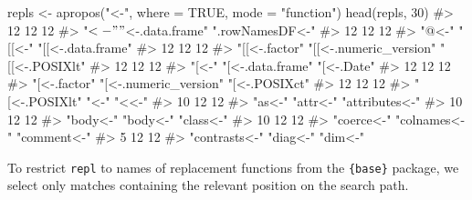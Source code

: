 \documentclass[
]{krantz}
\makeatletter
\newenvironment{Shaded}{\begin{snugshade}}{\end{snugshade}}
\newcommand{\CommentTok}[1]{\textcolor[rgb]{0.56,0.35,0.01}{\textit{#1}}}
\newcommand{\DataTypeTok}[1]{\textcolor[rgb]{0.13,0.29,0.53}{#1}}
\newcommand{\DecValTok}[1]{\textcolor[rgb]{0.00,0.00,0.81}{#1}}
\newcommand{\KeywordTok}[1]{\textcolor[rgb]{0.13,0.29,0.53}{\textbf{#1}}}
\newcommand{\NormalTok}[1]{#1}
\newcommand{\OtherTok}[1]{\textcolor[rgb]{0.56,0.35,0.01}{#1}}
\newcommand{\StringTok}[1]{\textcolor[rgb]{0.31,0.60,0.02}{#1}}
\newenvironment{kframe}{%
\medskip{}
\setlength{\fboxsep}{.8em}
 \def\at@end@of@kframe{}%
 \ifinner\ifhmode%
  \def\at@end@of@kframe{\end{minipage}}%
  \begin{minipage}{\columnwidth}%
 \fi\fi%
 \def\FrameCommand##1{\hskip\@totalleftmargin \hskip-\fboxsep
 \colorbox{shadecolor}{##1}\hskip-\fboxsep
     \hskip-\linewidth \hskip-\@totalleftmargin \hskip\columnwidth}%
 \MakeFramed {\advance\hsize-\width
   \@totalleftmargin\z@ \linewidth\hsize
   \@setminipage}}%
 {\par\unskip\endMakeFramed%
 \at@end@of@kframe}
\renewenvironment{Shaded}{\begin{kframe}}{\end{kframe}}
\renewcommand{\KeywordTok} [1]{\textcolor[rgb]{0.00,0.44,0.13}{{#1}}}
\renewcommand{\DataTypeTok}[1]{\textcolor[rgb]{0.56,0.13,0.00}{{#1}}}
\renewcommand{\DecValTok}  [1]{\textcolor[rgb]{0.25,0.63,0.44}{{#1}}}
\renewcommand{\StringTok}  [1]{\textcolor[rgb]{0.25,0.44,0.63}{{#1}}}
\renewcommand{\CommentTok} [1]{\textcolor[rgb]{0.38,0.63,0.69}{{#1}}}
\renewcommand{\OtherTok}   [1]{\textcolor[rgb]{0.00,0.44,0.13}{{#1}}}
\renewcommand{\NormalTok}  [1]{{#1}}
\makeatother
\begin{document}
\begin{Shaded}
\begin{Highlighting}[]
\NormalTok{repls <-}\StringTok{ }\KeywordTok{apropos}\NormalTok{(}\StringTok{"<-"}\NormalTok{, }\DataTypeTok{where =} \OtherTok{TRUE}\NormalTok{, }\DataTypeTok{mode =} \StringTok{"function"}\NormalTok{)}
\KeywordTok{head}\NormalTok{(repls, }\DecValTok{30}\NormalTok{)}
\CommentTok{#>                     12                     12                     12 }
\CommentTok{#>                  "$<-"       "$<-.data.frame"        ".rowNamesDF<-" }
\CommentTok{#>                     12                     12                     12 }
\CommentTok{#>                  "@<-"                 "[[<-"      "[[<-.data.frame" }
\CommentTok{#>                     12                     12                     12 }
\CommentTok{#>          "[[<-.factor" "[[<-.numeric_version"         "[[<-.POSIXlt" }
\CommentTok{#>                     12                     12                     12 }
\CommentTok{#>                  "[<-"       "[<-.data.frame"             "[<-.Date" }
\CommentTok{#>                     12                     12                     12 }
\CommentTok{#>           "[<-.factor"  "[<-.numeric_version"          "[<-.POSIXct" }
\CommentTok{#>                     12                     12                     12 }
\CommentTok{#>          "[<-.POSIXlt"                   "<-"                  "<<-" }
\CommentTok{#>                     10                     12                     12 }
\CommentTok{#>                 "as<-"               "attr<-"         "attributes<-" }
\CommentTok{#>                     10                     12                     12 }
\CommentTok{#>               "body<-"               "body<-"              "class<-" }
\CommentTok{#>                     10                     12                     12 }
\CommentTok{#>             "coerce<-"           "colnames<-"            "comment<-" }
\CommentTok{#>                      5                     12                     12 }
\CommentTok{#>          "contrasts<-"               "diag<-"                "dim<-"}
\end{Highlighting}
\end{Shaded}

To restrict \texttt{repl} to names of replacement functions from the \texttt{\{base\}} package, we select only matches containing the relevant position on the search path.
\end{document}
